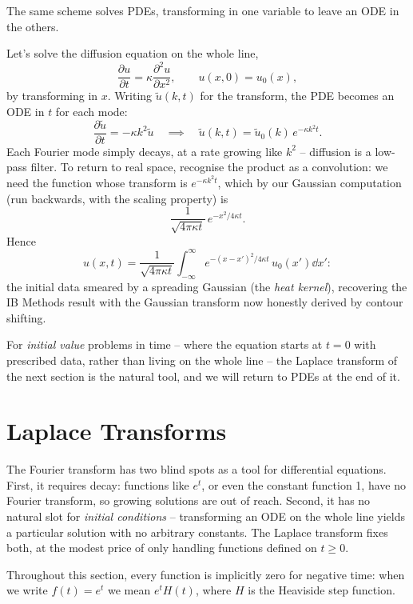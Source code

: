 \documentclass[a4paper]{scrartcl}
\begin{document}
The same scheme solves PDEs, transforming in one variable to leave an ODE in the others.

\begin{example}
	Let's solve the diffusion equation on the whole line,
	$$
	\frac{\partial u}{\partial t} = \kappa \frac{\partial^2 u}{\partial x^2}, \qquad u(x, 0) = u_0(x),
	$$
	by transforming in $x$. Writing $\tilde u(k, t)$ for the transform, the PDE becomes an ODE in $t$ for each mode:
	$$
	\frac{\partial \tilde u}{\partial t} = -\kappa k^2 \tilde u
	\quad\implies\quad
	\tilde u(k, t) = \tilde u_0(k)\, e^{-\kappa k^2 t}.
	$$
	Each Fourier mode simply decays, at a rate growing like $k^2$ -- diffusion is a low-pass filter. To return to real space, recognise the product as a convolution: we need the function whose transform is $e^{-\kappa k^2 t}$, which by our Gaussian computation (run backwards, with the scaling property) is
	$$
	\frac{1}{\sqrt{4\pi \kappa t}} \, e^{-x^2/4\kappa t}.
	$$
	Hence
	$$
	u(x, t) = \frac{1}{\sqrt{4\pi \kappa t}}\int_{-\infty}^\infty e^{-(x - x')^2/4\kappa t} \, u_0(x') \dd x' :
	$$
	the initial data smeared by a spreading Gaussian (the \emph{heat kernel}), recovering the IB Methods result with the Gaussian transform now honestly derived by contour shifting.
\end{example}

For \emph{initial value} problems in time -- where the equation starts at $t = 0$ with prescribed data, rather than living on the whole line -- the Laplace transform of the next section is the natural tool, and we will return to PDEs at the end of it.

\section{Laplace Transforms}

The Fourier transform has two blind spots as a tool for differential equations. First, it requires decay: functions like $e^t$, or even the constant function 1, have no Fourier transform, so growing solutions are out of reach. Second, it has no natural slot for \emph{initial conditions} -- transforming an ODE on the whole line yields a particular solution with no arbitrary constants. The Laplace transform fixes both, at the modest price of only handling functions defined on $t \geq 0$.

Throughout this section, every function is implicitly zero for negative time: when we write $f(t) = e^t$ we mean $e^t H(t)$, where $H$ is the Heaviside step function.
\end{document}
